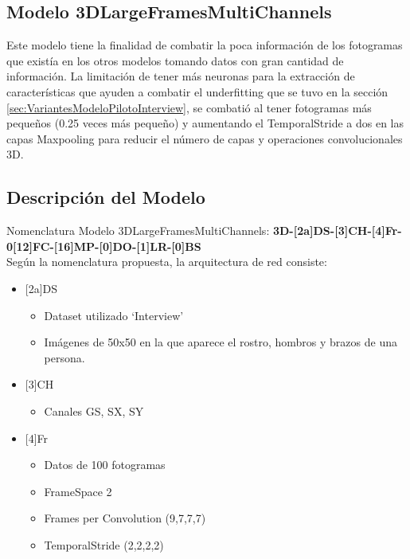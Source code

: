 \begin{onehalfspacing}


\section{ Modelo 3DLargeFramesMultiChannels}
\label{sec:3DDNN-100F-MultiChannels-FS-TS}

Este modelo tiene la finalidad de combatir la poca información de los fotogramas que existía en los otros modelos tomando datos con gran cantidad de información. La limitación de tener más neuronas para la extracción de características que ayuden a combatir el underfitting que se tuvo en la sección \ref{sec:VariantesModeloPilotoInterview}, se combatió al tener fotogramas más pequeños (0.25 veces más pequeño) y aumentando el TemporalStride a dos en las capas Maxpooling para reducir el número de capas y operaciones convolucionales 3D.


\subsection{Descripción del Modelo}
\label{sec:DescripcionModeloLarge}

Nomenclatura Modelo 3DLargeFramesMultiChannels: \textbf{3D-[2a]DS-[3]CH-[4]Fr-0[12]FC-[16]MP-[0]DO-[1]LR-[0]BS}\\

Según la nomenclatura propuesta, la arquitectura de red consiste:\\

\begin{itemize}
    \item {[2a]DS}
        \begin{itemize}
            \item Dataset utilizado `Interview'
            \item Imágenes de 50x50 en la que aparece el rostro, hombros y brazos de una persona.
    \end{itemize}
    
    \item {[3]CH}
        \begin{itemize}
            \item Canales GS, SX, SY
    \end{itemize}

    \item {[4]Fr}
        \begin{itemize}
            \item Datos de 100 fotogramas
            \item FrameSpace 2
            \item Frames per Convolution (9,7,7,7)
            \item TemporalStride (2,2,2,2)
    \end{itemize}
    

\end{itemize}
\end{onehalfspacing}
